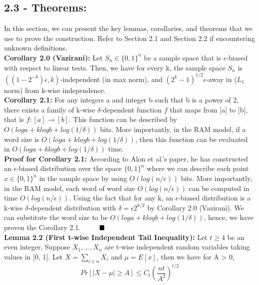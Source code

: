 \documentclass[a4paper, english]{paper}
\begin{document}
	\subsection{2.3 - Theorems:}
	In this section, we can present the key lemmas, corollaries, and theorems that we use to prove the construction. Refer to Section 2.1 and Section 2.2 if encountering unknown definitions. \\
	
	\noindent\textbf{Corollary 2.0 (Vazirani):} Let $S_n \in \{0, 1\}^n$ be a sample space that is $\epsilon$-biased with respect to linear tests. Then, we have for every k, the sample space $S_n$ is $((1-2^{-k})\epsilon, k)$-independent (in max norm), and $(2^k-1)^{1/2}\epsilon$-away  in ($L_1$ norm) from k-wise independence. \\
	
	\noindent\textbf{Corollary 2.1:} For any integers a and integer b such that b is a power of 2, there exists a family of k-wise $\delta$-dependent function $f$ that maps from [a] to [b], that is $f: [a] \rightarrow [b]$. This function can be described by $O(loga + klogb+ log(1/\delta))$ bits. More importantly, in the RAM model, if a word size is $O(loga + klogb+ log(1/\delta))$, then this function can be evaluated in $O(loga + klogb+ log(1/\delta))$ time. \\
	
	\noindent\textbf{Proof for Corollary 2.1:}
	According to Alon et al.'s paper, he has constructed an $\epsilon$-biased distribution over the space $\{0, 1\}^n$ where we can describe each point $x \in \{0, 1\}^n$ in the sample space by using $O(log(n/\epsilon))$ bits. More importantly, in the RAM model, each word of word size $O(log(n/\epsilon))$ can be computed in time $O(log(n/\epsilon))$. Using the fact that for any k, an $\epsilon$-biased distribution is a k-wise $\delta$-dependent distribution with $\delta = \epsilon 2^{k/2}$ by Corollary 2.0 (Vazirani). We can substitute the word size to be $O(loga + klogb+ log(1/\delta))$, hence, we have proven the Corollary 2.1.  $\qquad$ $\hfill\blacksquare$ \\
	
	\noindent\textbf{Lemma 2.2 (First t-wise Independent Tail Inequality):} Let $t \ge 4$ be an even integer, Suppose $X_1, ..., X_n$ are t-wise independent random variables taking values in [0, 1]. Let $X = \sum_{i \in n} X_i$ and $\mu = E[x]$, then we have for A > 0,
	$$Pr[|X-\mu| \ge A] \le C_t (\frac{nt}{A^2})^{t/2}$$
	
\end{document}
